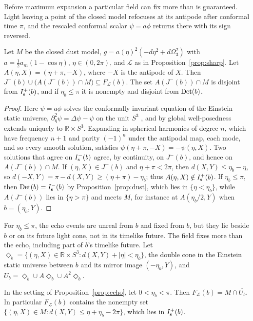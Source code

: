 Before maximum expansion a particular field can fix more than is guaranteed.
Light leaving a point of the closed model refocuses at its antipode after
conformal time $\pi$, and the rescaled conformal scalar $\psi=a\phi$ returns
there with its sign reversed.

\begin{proposition}\label{prop:echo}
Let $M$ be the closed dust model, $g=a(\eta)^2(-d\eta^2+d\Omega_3^2)$ with
$a=\tfrac12a_m(1-\cos\eta)$, $\eta\in(0,2\pi)$, and $\mathcal L$ as in
Proposition~\ref{prop:sharp}. Let $A(\eta,X)=(\eta+\pi,-X)$, where $-X$ is the
antipode of $X$. Then $J^-(b)\cup\bigl(A(J^-(b))\cap M\bigr)\subseteq
F_{\mathcal L}(b)$. The set $A(J^-(b))\cap M$ is disjoint from $I^+_{\mathrm s}(b)$, and if
$\eta_b\le\pi$ it is nonempty and disjoint from $\mathrm{Det}(b)$.
\end{proposition}

\begin{proof}
Here $\psi=a\phi$ solves the conformally invariant equation of the Einstein
static universe, $\partial_\eta^2\psi=\Delta\psi-\psi$ on the unit $S^3$
\citep[app.~D]{Wald1984}, and by global well-posedness extends uniquely to
$\mathbb R\times S^3$.
Expanding in spherical harmonics of degree $n$, which have frequency $n+1$
and parity $(-1)^n$ under the antipodal map, each mode, and so every smooth
solution, satisfies $\psi(\eta+\pi,-X)=-\psi(\eta,X)$. Two solutions that agree on $I^-_{\mathrm s}(b)$ agree, by continuity, on $J^-(b)$, and
hence on $A(J^-(b))\cap M$. If $(\eta,X)\in J^-(b)$ and $\eta+\pi<2\pi$, then
$d(X,Y)\le\eta_b-\eta$, so $d(-X,Y)=\pi-d(X,Y)\ge(\eta+\pi)-\eta_b$;
thus $A(\eta,X)\notin I^+_{\mathrm s}(b)$. If $\eta_b\le\pi$, then
$\mathrm{Det}(b)=I^-_{\mathrm s}(b)$ by Proposition~\ref{prop:dust}, which lies in
$\{\eta<\eta_b\}$, while $A(J^-(b))$ lies in $\{\eta>\pi\}$ and meets $M$, for
instance at $A(\eta_b/2,Y)$ when $b=(\eta_b,Y)$.
\end{proof}

For $\eta_b\le\pi$, the echo events are unreal from $b$ and fixed from $b$,
but they lie beside $b$ or on its future light cone, not in its timelike
future. The field fixes
more than the echo, including part of $b$'s timelike future. Let
$\Diamond_b=\{(\eta,X)\in\mathbb R\times S^3:d(X,Y)+|\eta|<\eta_b\}$, the double
cone in the Einstein static universe between $b$ and its mirror image
$(-\eta_b,Y)$, and $U_b=\Diamond_b\cup A\Diamond_b\cup A^2\Diamond_b$.

\begin{theorem}\label{thm:diamonds}
In the setting of Proposition~\ref{prop:echo}, let $0<\eta_b<\pi$. Then
$F_{\mathcal L}(b)=M\cap\overline{U_b}$. In
particular $F_{\mathcal L}(b)$ contains the nonempty set
$\{(\eta,X)\in M:d(X,Y)\le\eta+\eta_b-2\pi\}$, which lies in $I^+_{\mathrm s}(b)$.
\end{theorem}


